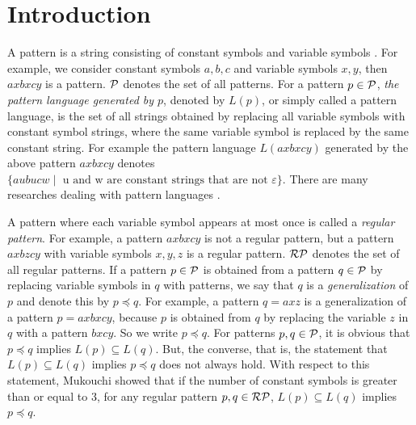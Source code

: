 \section{Introduction}

A pattern is a string consisting of constant symbols and variable symbols \cite{Angluin1980a}.
For example, we consider constant symbols $a,b,c$ and variable symbols $x,y$,  then $axbxcy$ is a pattern.
$\mathcal{P}$ denotes the set of all patterns.
For a pattern $p\in \mathcal{P}$, {\it the pattern language generated by $p$}, denoted by $L(p)$, or simply called a pattern language, is the set of all strings obtained by replacing all variable symbols with constant symbol strings, where the same variable symbol is replaced by the same constant string.
For example the pattern language $L(axbxcy)$ generated by the above pattern $axbxcy$ denotes $\{ aubucw \mid \mbox{  u and w are constant strings that are not $\varepsilon$} \}$.
There are many researches dealing with pattern languages \cite{Angluin1980b,Wright1989,Sato1,Shinohara2000,Day2017,Matsumoto2020}.


A pattern where each variable symbol appears at most once is called a {\it regular pattern}. 
For example, a pattern $axbxcy$ is not a regular pattern, but a pattern $axbzcy$ with variable symbols $x,y,z$ is a regular pattern.
$\mathcal{RP}$ denotes the set of all regular patterns.
If a pattern $p\in \mathcal{P}$ is obtained from a pattern $q\in\mathcal{P}$ by replacing variable symbols in $q$ with patterns, we say that $q$ is a {\it generalization} of $p$ and denote this by $p\preceq q$.
For example, a pattern $q=axz$ is a generalization of a pattern $p=axbxcy$, because $p$ is obtained from $q$ by replacing the variable $z$ in $q$ with a pattern $bxcy$.
So we write $p\preceq q$.
For patterns $p,q\in \mathcal{P}$, it is obvious that $p\preceq q$ implies $L(p)\subseteq L(q)$.
But, the converse, that is, the statement that  $L(p)\subseteq L(q)$ implies $p\preceq q$ does not always hold.
With respect to this statement, Mukouchi\cite{Mukouchi1991} showed that if the number of constant symbols is greater than or equal to 3, for any regular pattern $p,q\in \mathcal{RP}$, $L(p)\subseteq L(q)$ implies $p\preceq q$.

